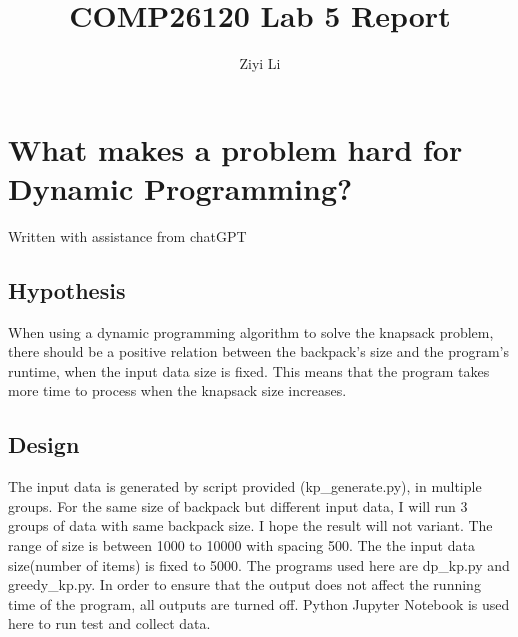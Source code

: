 \documentclass[a4]{article}
\title{COMP26120 Lab 5 Report}
\author{Ziyi Li}
\begin{document}
\maketitle


\section{What makes a problem hard for Dynamic Programming?}
Written with assistance from chatGPT

\subsection{Hypothesis}

When using a dynamic programming algorithm to solve the knapsack problem, there should be a positive relation between the backpack's size and the program's runtime, when the input data size is fixed. This means that the program takes more time to process when the knapsack size increases.

\subsection{Design}

The input data is generated by script provided (kp\_generate.py), in multiple groups. For the same size of backpack but different input data, I will run 3 groups of data with same backpack size. I hope the result will not variant. The range of size is between 1000 to 10000 with spacing 500. The the input data size(number of items) is fixed to 5000. The programs used here are dp\_kp.py and greedy\_kp.py. In order to ensure that the output does not affect the running time of the program, all outputs are turned off. Python Jupyter Notebook is used here to run test and collect data.
\end{document}
